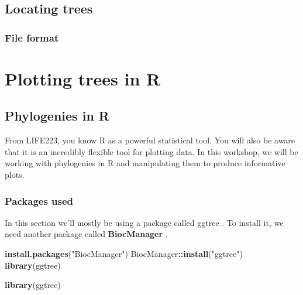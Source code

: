 \documentclass[
]{book}
\newenvironment{Shaded}{\begin{snugshade}}{\end{snugshade}}
\newcommand{\KeywordTok}[1]{\textcolor[rgb]{0.13,0.29,0.53}{\textbf{#1}}}
\newcommand{\NormalTok}[1]{#1}
\newcommand{\OperatorTok}[1]{\textcolor[rgb]{0.81,0.36,0.00}{\textbf{#1}}}
\newcommand{\StringTok}[1]{\textcolor[rgb]{0.31,0.60,0.02}{#1}}
\begin{document}
\hypertarget{locating-trees}{%
\section{Locating trees}\label{locating-trees}}

\hypertarget{file-format}{%
\subsection{File format}\label{file-format}}

\hypertarget{w1plotting}{%
\chapter{Plotting trees in R}\label{w1plotting}}

\hypertarget{phylogenies-in-r}{%
\section{Phylogenies in R}\label{phylogenies-in-r}}

From LIFE223, you know R as a powerful statistical tool. You will also be aware that it is an incredibly flexible tool for plotting data. In this workshop, we will be working with phylogenies in R and manipulating them to produce informative plots.

\hypertarget{packages-used}{%
\subsection{Packages used}\label{packages-used}}

In this section we'll mostly be using a package called ggtree \citep{Yu17, Yu18}. To install it, we need another package called \textbf{BiocManager} \citep{Morgan19}.

\begin{Shaded}
\begin{Highlighting}[]
\KeywordTok{install.packages}\NormalTok{(}\StringTok{"BiocManager"}\NormalTok{)}
\NormalTok{BiocManager}\OperatorTok{::}\KeywordTok{install}\NormalTok{(}\StringTok{"ggtree"}\NormalTok{)}
\KeywordTok{library}\NormalTok{(ggtree)}
\end{Highlighting}
\end{Shaded}

\begin{Shaded}
\begin{Highlighting}[]
\KeywordTok{library}\NormalTok{(ggtree)}
\end{Highlighting}
\end{Shaded}
\end{document}
